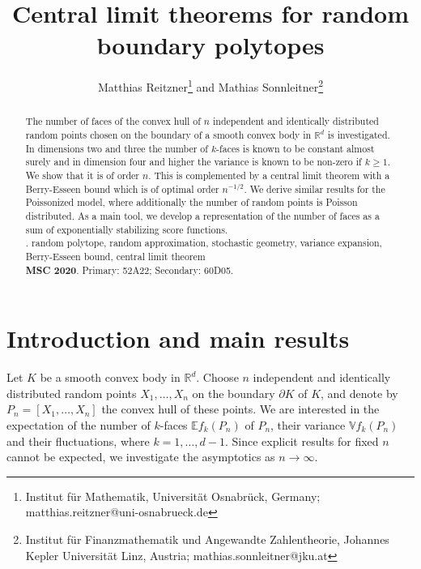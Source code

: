 \documentclass[12pt]{article}
\def\E{{\mathds E}}
\def\V{{\mathds V}}
\def\R{{\mathds{R}}}
\def\bd{{\partial}}
\theoremstyle{definition}
\begin{document}
\title{Central limit theorems for random boundary polytopes}
\author{
Matthias Reitzner\thanks{Institut f\"ur Mathematik, Universit\"at Osnabr\"uck, Germany; matthias.reitzner@uni-osnabrueck.de} and
Mathias Sonnleitner\thanks{Institut f\"ur Finanzmathematik und Angewandte Zahlentheorie, Johannes Kepler Universit\"at Linz, Austria; mathias.sonnleitner@jku.at}}
\date{}

\maketitle

\begin{abstract}
	The number of faces of the convex hull of $n$ independent and identically distributed random points chosen on the boundary of a smooth convex body in $ \R^d$ is investigated. In dimensions two and three the number of $k$-faces is known to be constant almost surely and in dimension four and higher the variance is known to be non-zero if $k\ge 1$. We show that it is of order $n$. This is complemented by a central limit theorem with a Berry-Esseen bound which is of optimal order $n^{-1/2}$.  We derive similar results for the Poissonized model, where additionally the number of random points is Poisson distributed. As a main tool, we develop a representation of the number of faces as a sum of exponentially stabilizing score functions. 
	\\

	. random polytope, random approximation, stochastic geometry, variance expansion, Berry-Esseen bound, central limit theorem\\
	{\bf MSC 2020}. Primary: 52A22; Secondary: 60D05.
\end{abstract}

\maketitle





\section{Introduction and main results}

Let $K$ be a smooth convex body in $\R^d$. Choose $n$ independent and identically distributed random points $X_1, \dots, X_n$ on the boundary $\bd K$ of $K$, and denote by $P_n= [X_1, \dots, X_n]$ the convex hull of these points. We are interested in the expectation of the number of $k$-faces $\E f_k (P_n)$ of $P_n$, their variance $\V f_k(P_n)$ and their fluctuations, where $k =1, \dots, d-1$. Since explicit results for fixed $n$ cannot be expected, we investigate the asymptotics as $n \to \infty$.
\end{document}
